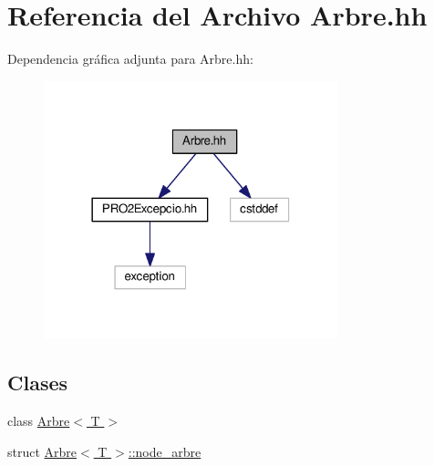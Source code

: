 \hypertarget{_arbre_8hh}{}\section{Referencia del Archivo Arbre.\+hh}
\label{_arbre_8hh}
Dependencia gráfica adjunta para Arbre.\+hh\+:
\nopagebreak
\begin{figure}[H]
\begin{center}
\leavevmode
\includegraphics[width=242pt]{_arbre_8hh__incl}
\end{center}
\end{figure}
\subsection*{Clases}
\begin{DoxyCompactItemize}
\item 
class \hyperlink{class_arbre}{Arbre$<$ T $>$}
\item 
struct \hyperlink{struct_arbre_1_1node__arbre}{Arbre$<$ T $>$\+::node\+\_\+arbre}
\end{DoxyCompactItemize}
